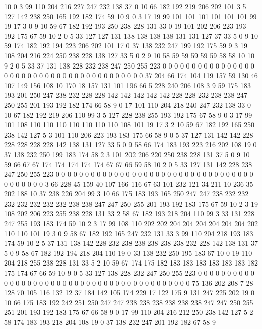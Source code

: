 10 0 3 99 110 204 216 227 247 232 138 37 0 10 66 182 192 219 206 202
101 3 5 127 142 238 250 165 192 182 174 59 10 9 0 3 17 19 99 101
101 101 101 101 101 99 19 17 3 0 9 10 59 67 182 192 193 250 238 228
131 33 0 19 101 202 206 223 193 192 175 67 59 10 2 0 5 33 127 127
131 138 138 138 138 131 131 127 37 33 5 0 9 10 59 174 182 192 194 223
206 202 101 17 0 37 138 232 247 199 192 175 59 9 3 19 108 204 216 224
250 238 228 138 127 33 5 0 2 9 10 58 59 59 59 59 59 58 58 10
10 9 2 0 5 33 37 131 138 228 232 238 247 250 255 223 0 0 0 0
0 0 0 0 0 0 0 0 0 0 0 0 0 0 0 0 0 0 0 0
0 0 0 0 0 0 0 0 0 0 0 0 0 0 0 0 37 204 66 174
104 119 157 59 130 46 107 149 156 108 10 170 18 157 131 101 196 66 5 228
240 206 108 3 9 59 175 183 193 201 250 247 238 232 228 228 142 142 142 142
142 228 228 232 238 238 247 250 255 201 193 192 182 174 66 58 9 0 17 101
110 204 218 240 247 232 138 33 0 10 67 182 192 219 206 110 99 3 5 127
228 238 255 193 192 175 67 58 9 0 3 17 99 101 108 110 110 110 110 110
110 110 108 101 19 17 3 2 10 59 67 182 192 165 250 238 142 127 5 3
101 110 206 223 193 183 175 66 58 9 0 5 37 127 131 142 142 228 228 228
228 228 142 138 131 127 33 5 0 9 58 66 174 183 193 223 216 202 108 19
0 37 138 232 250 199 183 174 58 2 3 101 202 206 220 250 238 228 131 37
5 0 9 10 59 66 67 67 174 174 174 174 174 67 67 66 59 58 10 2
0 5 33 127 131 142 228 238 247 250 255 223 0 0 0 0 0 0 0 0
0 0 0 0 0 0 0 0 0 0 0 0 0 0 0 0 0 0 0 0
0 0 0 0 0 0 0 0 0 0 0 0 0 3 66 228 45 159 40 107
166 116 67 63 101 232 121 34 211 10 236 35 202 188 10 37 238 226 204 99
3 10 66 175 183 193 165 250 247 247 238 232 232 232 232 232 232 232 238 238
247 247 250 255 201 193 192 183 175 67 59 10 2 3 19 108 202 206 223 255
238 228 131 33 2 58 67 182 193 218 204 110 99 3 33 131 228 247 255 193
183 174 59 10 2 3 17 99 108 110 202 202 204 204 204 204 204 204 202 110
110 101 19 3 0 9 58 67 182 192 165 247 232 131 33 3 99 110 204 218
193 183 174 59 10 2 5 37 131 138 142 228 232 238 238 238 238 238 232 228
142 138 131 37 5 0 9 58 67 182 192 194 218 204 110 19 0 33 138 232
250 195 183 67 10 0 19 110 204 218 255 238 228 131 33 5 2 10 59 67
174 175 182 183 183 183 183 183 183 182 175 174 67 66 59 10 9 0 5 33
127 138 228 232 247 250 255 223 0 0 0 0 0 0 0 0 0 0 0 0
0 0 0 0 0 0 0 0 0 0 0 0 0 0 0 0 0 0 0 0
0 0 0 0 0 0 0 0 0 0 75 136 202 208 7 28 128 70 105 116
132 12 37 184 142 105 174 229 17 122 175 9 131 247 225 202 19 0 10 66
175 183 192 242 251 250 247 247 238 238 238 238 238 238 247 247 250 255 251 201
193 192 183 175 67 66 58 9 0 17 99 110 204 216 212 250 238 142 127 5
2 58 174 183 193 218 204 108 19 0 37 138 232 247 201 192 182 67 58 9
